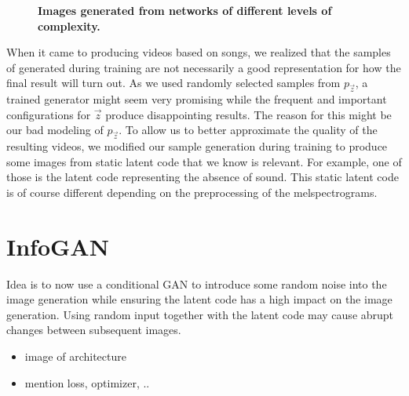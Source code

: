             \begin{figure}[h]
                \centering
                \caption[Images generated from networks of different levels of complexity]
                {
                    \textbf{Images generated from networks of different levels of complexity.}
                }
                \label{fig:network_complexity}
            \end{figure}

            When it came to producing videos based on songs, we realized that the samples of generated during training are not necessarily a good representation for how the final result will turn out. As we used randomly selected samples from $p_{\vec{z}}$, a trained generator might seem very promising while the frequent and important configurations for $\vec{z}$ produce disappointing results. The reason for this might be our bad modeling of $p_{\vec{z}}$. To allow us to better approximate the quality of the resulting videos, we modified our sample generation during training to produce some images from static latent code that we know is relevant. For example, one of those is the latent code representing the absence of sound. This static latent code is of course different depending on the preprocessing of the melspectrograms.

    \section{InfoGAN}

        Idea is to now use a conditional GAN to introduce some random noise into the image generation while ensuring the latent code has a high impact on the image generation. Using random input together with the latent code may cause abrupt changes between subsequent images.
        \begin{itemize}
            \item image of architecture
            \item mention loss, optimizer, ..
        \end{itemize}